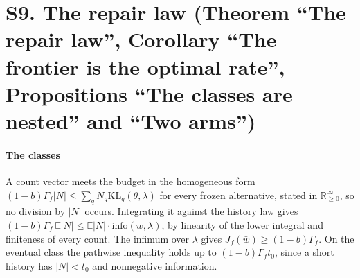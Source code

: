
\section{S9. The repair law (Theorem ``The repair law'', Corollary ``The frontier is the optimal
rate'', Propositions ``The classes are nested'' and ``Two arms'')}

\paragraph{The classes} A count vector meets the budget in the homogeneous form
$(1-b)\Gamma_f|N|\le\sum_qN_q\mathrm{KL}_q(\theta,\lambda)$ for every frozen alternative, stated in
$\mathbb R_{\ge0}^\infty$, so no division by $|N|$ occurs. Integrating it against the history law
gives $(1-b)\Gamma_f\,\mathbb E|N|\le\mathbb E|N|\cdot\mathrm{info}(\bar w,\lambda)$, by
linearity of the lower integral and finiteness of every count. The infimum over $\lambda$ gives
$J_f(\bar w)\ge(1-b)\Gamma_f$. On the eventual class the pathwise inequality holds up to
$(1-b)\Gamma_ft_0$, since a short history has $|N|<t_0$ and nonnegative information.


